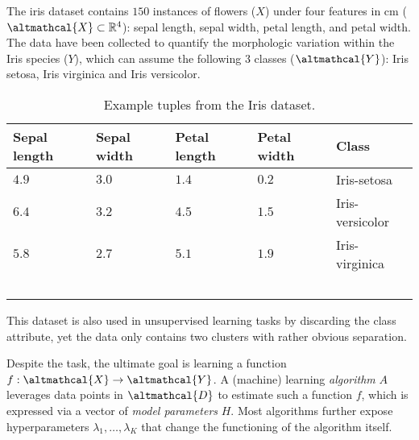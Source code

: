 \documentclass[a4paper,12pt,times,numbered,print,index]{Classes/PhDThesisPSnPDF}
\begin{document}
\begin{example}
    The iris dataset contains $150$ instances of flowers ($X$) under four features in cm ($\altmathcal{X} \subset \mathbb{R}^4$): sepal length, sepal width, petal length, and petal width.
    The data have been collected to quantify the morphologic variation within the Iris species ($Y$), which can assume the following $3$ classes ($\altmathcal{Y}$): Iris setosa, Iris virginica and Iris versicolor.
    \begin{table}[!h]
        \centering
        \begin{tabular}{llll|l}
            \hline
            Sepal length & Sepal width & Petal length & Petal width & Class \\ \hline
            $4.9$ & $3.0$ & $1.4$ & $0.2$ & Iris-setosa \\
            $6.4$ & $3.2$ & $4.5$ & $1.5$ & Iris-versicolor \\
            $5.8$ & $2.7$ & $5.1$ & $1.9$ & Iris-virginica \\ \hline
            \
        \end{tabular}
        \caption{Example tuples from the Iris dataset.}
        \label{tbl:iris}
    \end{table}
    This dataset is also used in unsupervised learning tasks by discarding the class attribute, yet the data only contains two clusters with rather obvious separation.
\end{example}



Despite the task, the ultimate goal is learning a function $f: \altmathcal{X} \rightarrow \altmathcal{Y}$. A (machine) learning \textit{algorithm} $A$ leverages data points in $\altmathcal{D}$ to estimate such a function $f$, which is expressed via a vector of \textit{model parameters} $H$.
Most algorithms further expose hyperparameters $\lambda_1, \dots, \lambda_K$ that change the functioning of the algorithm itself.
\end{document}
